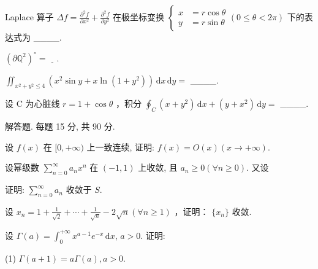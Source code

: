 Laplace 算子  $\Delta f = \frac{\partial^{2}f}{\partial x^{2}} + \frac{\partial^{2}f}{\partial y^{2}}$  在极坐标变换  $\left\{\begin{aligned}x &= r\cos\theta \\ y &= r\sin\theta\end{aligned}\right.$$(0 \leq \theta < 2\pi)$  下的表达式为 \_\_\_\_.\par
$(\partial \mathbb{Q}^2)^\circ = \underline{\quad}$.\par
$\iint_{x^2 + y^2 \leq 4} (x^2 \sin y + x \ln (1 + y^2)) \, \mathrm{d}x \, \mathrm{d}y =$ \_\_\_\_.\par
设 C 为心脏线  $r = 1 + \cos \theta$ ，积分  $\oint_{C} (x + y^{2}) \, \mathrm{d}x + (y + x^{2}) \, \mathrm{d}y =$  \_\_\_\_.\par
\par{}
解答题. 每题 15 分, 共 90 分.\par
设 $f(x)$ 在 $[0, +\infty)$ 上一致连续, 证明: $f(x) = O(x) (x \to +\infty)$.\par
\par{}
设幂级数 $\sum_{n=0}^{\infty} a_n x^n$ 在 $(-1, 1)$ 上收敛, 且 $a_n \geq 0 (\forall n \geq 0)$. 又设\par
\nopagebreak[4]
证明: $\sum_{n=0}^{\infty} a_n$ 收敛于 $S$.\par
设  $x_{n}=1+\frac{1}{\sqrt{2}}+\cdots+\frac{1}{\sqrt{n}}-2\sqrt{n}(\forall n\geq1)$ ，证明： $\{x_{n}\}$  收敛.\par
设 $\Gamma(a) = \int_{0}^{+\infty} x^{a-1} e^{-x} \, \mathrm{d}x$, $a > 0$. 证明:\par
(1) $\Gamma(a + 1) = a\Gamma(a), a > 0.$\par
$$
